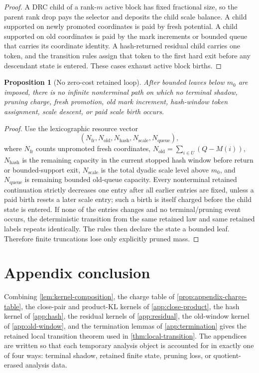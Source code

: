 \documentclass[11pt]{article}
\newcommand{\Cref}[1]{\ref{#1}}
\newtheorem{proposition}[theorem]{Proposition}
\theoremstyle{remark}
\newcommand{\old}{\mathrm{old}}
\newcommand{\fr}{\mathrm{fr}}
\begin{document}
\begin{proof}
A DRC child of a rank-$m$ active block has fixed fractional size, so the parent rank drop pays the selector and deposits the child scale balance.  A child supported on newly promoted coordinates is paid by fresh potential.  A child supported on old coordinates is paid by the mark increments or bounded queue that carries its coordinate identity.  A hash-returned residual child carries one token, and the transition rules assign that token to the first hard exit before any descendant state is entered.  These cases exhaust active block births.
\end{proof}

\begin{proposition}[No zero-cost retained loop]\label{prop:appendix-no-loop}
After bounded leaves below $m_0$ are imposed, there is no infinite nonterminal path on which no terminal shadow, pruning charge, fresh promotion, old mark increment, hash-window token assignment, scale descent, or paid scale birth occurs.
\end{proposition}

\begin{proof}
Use the lexicographic resource vector
\[
        (N_{\fr},N_{\old},N_{\mathrm{hash}},N_{\mathrm{scale}},N_{\mathrm{queue}}),
\]
where $N_{\fr}$ counts unpromoted fresh coordinates, $N_{\old}=\sum_{i\in U}(Q-M(i))$, $N_{\mathrm{hash}}$ is the remaining capacity in the current stopped hash window before return or bounded-support exit, $N_{\mathrm{scale}}$ is the total dyadic scale level above $m_0$, and $N_{\mathrm{queue}}$ is remaining bounded old-queue capacity.  Every nonterminal retained continuation strictly decreases one entry after all earlier entries are fixed, unless a paid birth resets a later scale entry; such a birth is itself charged before the child state is entered.  If none of the entries changes and no terminal/pruning event occurs, the deterministic transition from the same retained law and same retained labels repeats identically.  The rules then declare the state a bounded leaf.  Therefore finite truncations lose only explicitly pruned mass.
\end{proof}

\section{Appendix conclusion}\label{app:conclusion}

Combining \Cref{lem:kernel-composition}, the charge table of \Cref{prop:appendix-charge-table}, the close-pair and product-KL kernels of \Cref{app:close-product}, the hash kernel of \Cref{app:hash}, the residual kernels of \Cref{app:residual}, the old-window kernel of \Cref{app:old-window}, and the termination lemmas of \Cref{app:termination} gives the retained local transition theorem used in \Cref{thm:local-transition}.  The appendices are written so that each temporary analysis object is accounted for in exactly one of four ways: terminal shadow, retained finite state, pruning loss, or quotient-erased analysis data.
\end{document}

